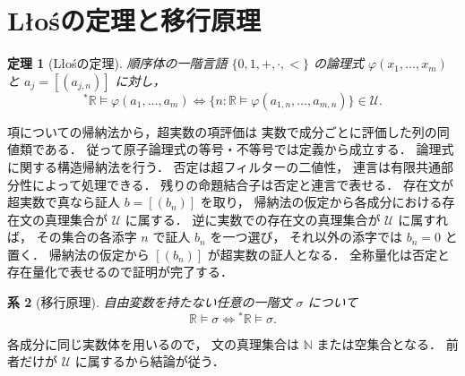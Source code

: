 \documentclass[a5paper,10pt,onecolumn]{jsarticle}
\makeatletter
\theoremstyle{mathnotetheorem}
\newtheorem{theorem}{定理}[section]
\newtheorem{corollary}[theorem]{系}
\renewcommand{\proofname}{証明}
\renewenvironment{proof}[1][\proofname]{%
  \par\pushQED{\qed}\normalfont\topsep4\p@\@plus2\p@\relax
  \trivlist\item[\hskip\labelsep\bfseries #1]\ignorespaces
}{\popQED\endtrivlist\@endpefalse}
\makeatother
\begin{document}
\section{L\l{}o\'sの定理と移行原理}
\begin{theorem}[L\l{}o\'sの定理]\label{thm:los}
順序体の一階言語
$\{0,1,+,\cdot,<\}$ の論理式
$\varphi(x_1,\dots,x_m)$ と
$a_j=[(a_{j,n})]$ に対し，
\[
 {}^*\mathbb R\models\varphi(a_1,\dots,a_m)
 \iff
 \{n:\mathbb R\models\varphi(a_{1,n},\dots,a_{m,n})\}
 \in\mathcal U.
\]
\end{theorem}
\begin{proof}
項についての帰納法から，超実数の項評価は
実数で成分ごとに評価した列の同値類である．
従って原子論理式の等号・不等号では定義から成立する．
論理式に関する構造帰納法を行う．
否定は超フィルターの二値性，
連言は有限共通部分性によって処理できる．
残りの命題結合子は否定と連言で表せる．
存在文が超実数で真なら証人 $b=[(b_n)]$ を取り，
帰納法の仮定から各成分における存在文の真理集合が
$\mathcal U$ に属する．
逆に実数での存在文の真理集合が $\mathcal U$ に属すれば，
その集合の各添字 $n$ で証人 $b_n$ を一つ選び，
それ以外の添字では $b_n=0$ と置く．
帰納法の仮定から $[(b_n)]$ が超実数の証人となる．
全称量化は否定と存在量化で表せるので証明が完了する．
\end{proof}
\begin{corollary}[移行原理]\label{cor:transfer}
自由変数を持たない任意の一階文 $\sigma$ について
\[
 \mathbb R\models\sigma\iff{}^*\mathbb R\models\sigma.
\]
\end{corollary}
\begin{proof}
各成分に同じ実数体を用いるので，
文の真理集合は $\mathbb N$ または空集合となる．
前者だけが $\mathcal U$ に属するから結論が従う．
\end{proof}
\end{document}
